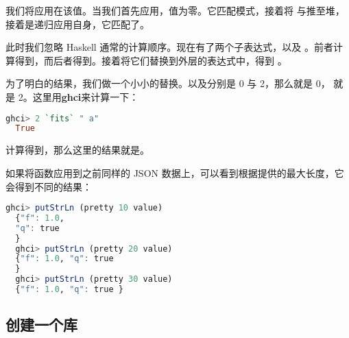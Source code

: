\documentclass[./main.tex]{subfiles}
\begin{document}
我们将应用在该值。当我们首先应用，值为零。它匹配模式，接着将
与推至堆，接着是递归应用自身，它匹配了。

此时我们忽略 Haskell 通常的计算顺序。现在有了两个子表达式，以及
。前者计算得到，而后者得到。接着将它们替换到外层的表达式中，得到
。

为了明白的结果，我们做一个小小的替换。以及分别是 0 与 2，那么就是 0，
就是 2。这里用\textbf{ghci}来计算一下：

\begin{lstlisting}[language=Haskell]
  ghci> 2 `fits` " a"
  True
\end{lstlisting}

计算得到，那么这里的结果就是。

如果将函数应用到之前同样的 JSON 数据上，可以看到根据提供的最大长度，它会得到不同的结果：

\begin{lstlisting}[language=Haskell]
  ghci> putStrLn (pretty 10 value)
  {"f": 1.0,
  "q": true
  }
  ghci> putStrLn (pretty 20 value)
  {"f": 1.0, "q": true
  }
  ghci> putStrLn (pretty 30 value)
  {"f": 1.0, "q": true }
\end{lstlisting}

\subsection*{创建一个库}



\end{document}
